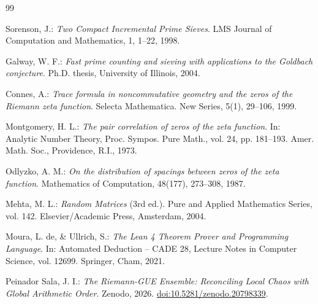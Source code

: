 \documentclass{article}
\numberwithin{equation}{section}
\theoremstyle{plain}
\theoremstyle{definition}
\begin{document}
\begin{thebibliography}{99}

Sorenson, J.: 
\emph{Two Compact Incremental Prime Sieves}.
LMS Journal of Computation and Mathematics, 1, 1--22, 1998.

Galway, W. F.: 
\emph{Fast prime counting and sieving with applications to the Goldbach conjecture}.
Ph.D. thesis, University of Illinois, 2004.

Connes, A.: 
\emph{Trace formula in noncommutative geometry and the zeros of the Riemann zeta function}.
Selecta Mathematica. New Series, 5(1), 29--106, 1999.

Montgomery, H. L.: 
\emph{The pair correlation of zeros of the zeta function}.
In: Analytic Number Theory, Proc. Sympos. Pure Math., vol. 24, pp. 181--193. Amer. Math. Soc., Providence, R.I., 1973.

Odlyzko, A. M.: 
\emph{On the distribution of spacings between zeros of the zeta function}.
Mathematics of Computation, 48(177), 273--308, 1987.

Mehta, M. L.: 
\emph{Random Matrices} (3rd ed.).
Pure and Applied Mathematics Series, vol. 142. Elsevier/Academic Press, Amsterdam, 2004.

Moura, L. de, \& Ullrich, S.:
\emph{The Lean 4 Theorem Prover and Programming Language}.
In: Automated Deduction – CADE 28, Lecture Notes in Computer Science, vol. 12699. Springer, Cham, 2021.

Peinador Sala, J. I.:
\emph{The Riemann-GUE Ensemble: Reconciling Local Chaos with Global Arithmetic Order}.
Zenodo, 2026. \href{https://doi.org/10.5281/zenodo.20798339}{doi:10.5281/zenodo.20798339}.

\end{thebibliography}
\end{document}
